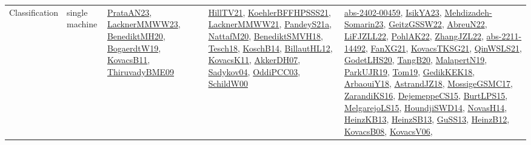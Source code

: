 {\begin{longtable}{lp{3cm}>{\raggedright}p{6cm}>{\raggedright}p{6cm}p{8cm}}
Classification & single machine & \href{articles/PrataAN23.pdf}{PrataAN23}\cite{PrataAN23}, \href{articles/LacknerMMWW23.pdf}{LacknerMMWW23}\cite{LacknerMMWW23}, \href{articles/BenediktMH20.pdf}{BenediktMH20}\cite{BenediktMH20}, \href{papers/BogaerdtW19.pdf}{BogaerdtW19}\cite{BogaerdtW19}, \href{articles/KovacsB11.pdf}{KovacsB11}\cite{KovacsB11}, \href{papers/ThiruvadyBME09.pdf}{ThiruvadyBME09}\cite{ThiruvadyBME09} & \href{papers/HillTV21.pdf}{HillTV21}\cite{HillTV21}, \href{articles/KoehlerBFFHPSSS21.pdf}{KoehlerBFFHPSSS21}\cite{KoehlerBFFHPSSS21}, \href{papers/LacknerMMWW21.pdf}{LacknerMMWW21}\cite{LacknerMMWW21}, \href{articles/PandeyS21a.pdf}{PandeyS21a}\cite{PandeyS21a}, \href{papers/NattafM20.pdf}{NattafM20}\cite{NattafM20}, \href{papers/BenediktSMVH18.pdf}{BenediktSMVH18}\cite{BenediktSMVH18}, \href{papers/Tesch18.pdf}{Tesch18}\cite{Tesch18}, \href{papers/KoschB14.pdf}{KoschB14}\cite{KoschB14}, \href{papers/BillautHL12.pdf}{BillautHL12}\cite{BillautHL12}, \href{articles/KovacsK11.pdf}{KovacsK11}\cite{KovacsK11}, \href{papers/AkkerDH07.pdf}{AkkerDH07}\cite{AkkerDH07}, \href{papers/Sadykov04.pdf}{Sadykov04}\cite{Sadykov04}, \href{papers/OddiPCC03.pdf}{OddiPCC03}\cite{OddiPCC03}, \href{articles/SchildW00.pdf}{SchildW00}\cite{SchildW00} & \href{articles/abs-2402-00459.pdf}{abs-2402-00459}\cite{abs-2402-00459}, \href{articles/IsikYA23.pdf}{IsikYA23}\cite{IsikYA23}, \href{papers/Mehdizadeh-Somarin23.pdf}{Mehdizadeh-Somarin23}\cite{Mehdizadeh-Somarin23}, \href{papers/GeitzGSSW22.pdf}{GeitzGSSW22}\cite{GeitzGSSW22}, \href{articles/AbreuN22.pdf}{AbreuN22}\cite{AbreuN22}, \href{papers/LiFJZLL22.pdf}{LiFJZLL22}\cite{LiFJZLL22}, \href{articles/PohlAK22.pdf}{PohlAK22}\cite{PohlAK22}, \href{papers/ZhangJZL22.pdf}{ZhangJZL22}\cite{ZhangJZL22}, \href{articles/abs-2211-14492.pdf}{abs-2211-14492}\cite{abs-2211-14492}, \href{articles/FanXG21.pdf}{FanXG21}\cite{FanXG21}, \href{papers/KovacsTKSG21.pdf}{KovacsTKSG21}\cite{KovacsTKSG21}, \href{articles/QinWSLS21.pdf}{QinWSLS21}\cite{QinWSLS21}, \href{papers/GodetLHS20.pdf}{GodetLHS20}\cite{GodetLHS20}, \href{papers/TangB20.pdf}{TangB20}\cite{TangB20}, \href{papers/MalapertN19.pdf}{MalapertN19}\cite{MalapertN19}, \href{papers/ParkUJR19.pdf}{ParkUJR19}\cite{ParkUJR19}, \href{papers/Tom19.pdf}{Tom19}\cite{Tom19}, \href{articles/GedikKEK18.pdf}{GedikKEK18}\cite{GedikKEK18}, \href{papers/ArbaouiY18.pdf}{ArbaouiY18}\cite{ArbaouiY18}, \href{papers/AstrandJZ18.pdf}{AstrandJZ18}\cite{AstrandJZ18}, \href{papers/MossigeGSMC17.pdf}{MossigeGSMC17}\cite{MossigeGSMC17}, \href{articles/ZarandiKS16.pdf}{ZarandiKS16}\cite{ZarandiKS16}, \href{papers/DejemeppeCS15.pdf}{DejemeppeCS15}\cite{DejemeppeCS15}, \href{papers/BurtLPS15.pdf}{BurtLPS15}\cite{BurtLPS15}, \href{papers/MelgarejoLS15.pdf}{MelgarejoLS15}\cite{MelgarejoLS15}, \href{papers/HoundjiSWD14.pdf}{HoundjiSWD14}\cite{HoundjiSWD14}, \href{articles/NovasH14.pdf}{NovasH14}\cite{NovasH14}, \href{papers/HeinzKB13.pdf}{HeinzKB13}\cite{HeinzKB13}, \href{articles/HeinzSB13.pdf}{HeinzSB13}\cite{HeinzSB13}, \href{papers/GuSS13.pdf}{GuSS13}\cite{GuSS13}, \href{papers/HeinzB12.pdf}{HeinzB12}\cite{HeinzB12}, \href{articles/KovacsB08.pdf}{KovacsB08}\cite{KovacsB08}, \href{papers/KovacsV06.pdf}{KovacsV06}\cite{KovacsV06}, 
\end{longtable}}
